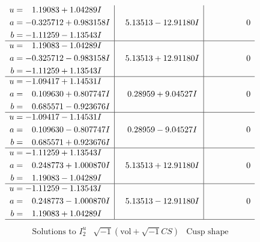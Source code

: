 \documentclass[1p]{elsarticle_modified}
\theoremstyle{definition}
\newcommand{\I}{\sqrt{-1}}
\begin{document}
$$\begin{array}{c|c|c}
\begin{aligned}
u &= \phantom{-}1.19083 + 1.04289 I \\
a &= -0.325712 + 0.983158 I \\
b &= -1.11259 - 1.13543 I\end{aligned}
 & \phantom{-}5.13513 - 12.91180 I & \phantom{-0.000000 } 0 \\ \hline\begin{aligned}
u &= \phantom{-}1.19083 - 1.04289 I \\
a &= -0.325712 - 0.983158 I \\
b &= -1.11259 + 1.13543 I\end{aligned}
 & \phantom{-}5.13513 + 12.91180 I & \phantom{-0.000000 } 0 \\ \hline\begin{aligned}
u &= -1.09417 + 1.14531 I \\
a &= \phantom{-}0.109630 + 0.807747 I \\
b &= \phantom{-}0.685571 - 0.923676 I\end{aligned}
 & \phantom{-}0.28959 + 9.04527 I & \phantom{-0.000000 } 0 \\ \hline\begin{aligned}
u &= -1.09417 - 1.14531 I \\
a &= \phantom{-}0.109630 - 0.807747 I \\
b &= \phantom{-}0.685571 + 0.923676 I\end{aligned}
 & \phantom{-}0.28959 - 9.04527 I & \phantom{-0.000000 } 0 \\ \hline\begin{aligned}
u &= -1.11259 + 1.13543 I \\
a &= \phantom{-}0.248773 + 1.000870 I \\
b &= \phantom{-}1.19083 - 1.04289 I\end{aligned}
 & \phantom{-}5.13513 + 12.91180 I & \phantom{-0.000000 } 0 \\ \hline\begin{aligned}
u &= -1.11259 - 1.13543 I \\
a &= \phantom{-}0.248773 - 1.000870 I \\
b &= \phantom{-}1.19083 + 1.04289 I\end{aligned}
 & \phantom{-}5.13513 - 12.91180 I & \phantom{-0.000000 } 0\\
 \hline 
 \end{array}$$\newpage$$\begin{array}{c|c|c}  
\text{Solutions to }I^u_{2}& \I (\text{vol} + \sqrt{-1}CS) & \text{Cusp shape}\\

\end{array}$$
\end{document}
